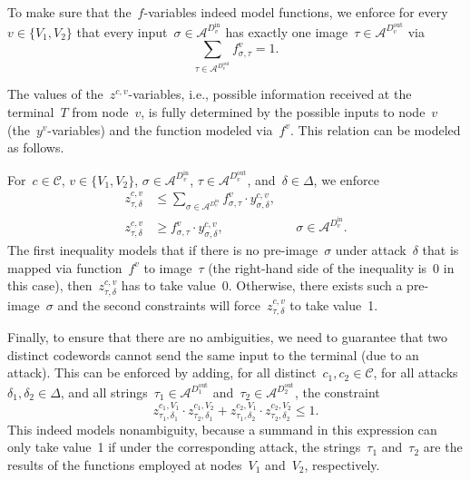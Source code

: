 \documentclass[11pt,a4paper]{article}
\theoremstyle{definition}
\begin{document}
To make sure that the~$f$-variables indeed model functions, we enforce for
every~$v \in \{V_1,V_2\}$ that every input~$\sigma \in
\mathcal{A}^{D^{\text{in}}_v}$ has exactly one image~$\tau \in
\mathcal{A}^{D^{\text{out}}_v}$ via
\[
  \sum_{\tau \in \mathcal{A}^{D^{\text{out}}_v}} f^v_{\sigma,\tau} = 1.
\]

The values of the~$z^{c,v}$-variables, i.e., possible information received
at the terminal~$T$ from node~$v$, is fully determined by the possible inputs
to node~$v$ (the~$y^v$-variables) and the function modeled via~$f^v$.
This relation can be modeled as follows.

For~$c \in \mathcal{C}$, $v \in \{V_1,V_2\}$, $\sigma \in
\mathcal{A}^{D^\text{in}_v}$, $\tau \in \mathcal{A}^{D^{\text{out}}_v}$,
and~$\delta \in \Delta$, we enforce
%
\begin{align*}
  z^{c,v}_{\tau,\delta}
  &\leq
    \sum_{\sigma \in \mathcal{A}^{D^{\text{in}}_v}} f^v_{\sigma,\tau} \cdot y^{c,v}_{\sigma,\delta}, &&\\
  z^{c,v}_{\tau,\delta}
  &\geq
    f^v_{\sigma,\tau} \cdot y^{c,v}_{\sigma,\delta}, && \sigma \in \mathcal{A}^{D^{\text{in}}_v}.
\end{align*}
%
The first inequality models that if there is no pre-image~$\sigma$ under
attack~$\delta$ that is mapped via function~$f^v$ to image~$\tau$ (the
right-hand side of the inequality is~0 in this case), then~$z^{c,v}_{\tau,\delta}$
has to take value~0.
Otherwise, there exists such a pre-image~$\sigma$ and the second
constraints will force~$z^{c,v}_{\tau,\delta}$ to take value~1.

Finally, to ensure that there are no ambiguities, we need to guarantee
that two distinct codewords cannot send the same input to the terminal (due
to an attack).
This can be enforced by adding, for all distinct~$c_1,c_2 \in \mathcal{C}$,
for all attacks~$\delta_1,\delta_2 \in \Delta$, and all
strings~$\tau_1 \in \mathcal{A}^{D^{\text{out}}_1}$ and~$\tau_2 \in
\mathcal{A}^{D^{\text{out}}_2}$, the constraint
\[
  z^{c_1,V_1}_{\tau_1,\delta_1}\cdot z^{c_1,V_2}_{\tau_2,\delta_1}
  +
  z^{c_2,V_1}_{\tau_1,\delta_2}\cdot z^{c_2,V_2}_{\tau_2,\delta_2}
  \leq
  1.
\]
This indeed models nonambiguity, because a summand in this expression can
only take value~1 if under the corresponding attack, the strings~$\tau_1$ and~$\tau_2$
are the results of the functions employed at nodes~$V_1$ and~$V_2$, respectively.
\end{document}
